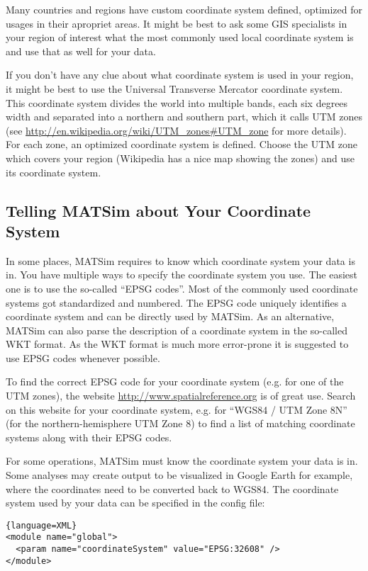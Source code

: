 Many countries and regions have custom coordinate system defined, optimized for
usages in their apropriet areas. It might be best to ask some GIS specialists in
your region of interest what the most commonly used local coordinate system is
and use that as well for your data. 

If you don't have any clue about what coordinate system is used in your region,
it might be best to use the Universal Transverse Mercator coordinate system.
This coordinate system divides the world into multiple bands, each six degrees
width and separated into a northern and southern part, which it calls UTM zones
(see \url{http://en.wikipedia.org/wiki/UTM_zones#UTM_zone} for more details).
For each zone, an optimized coordinate system is defined. Choose the UTM zone
which covers your region (Wikipedia has a nice map showing the zones) and use
its coordinate system.

\subsection{Telling MATSim about Your Coordinate System}

In some places, MATSim requires to know which coordinate system your data is in.
You have multiple ways to specify the coordinate system you use. The easiest one
is to use the so-called ``EPSG codes''. Most of the commonly used coordinate
systems got standardized and numbered. The EPSG code uniquely identifies a
coordinate system and can be directly used by MATSim. As an alternative, MATSim
can also parse the description of a coordinate system in the so-called WKT
format. As the WKT format is much more error-prone it is suggested to use EPSG
codes whenever possible.

To find the correct EPSG code for your coordinate system (e.g. for one of the
UTM zones), the website \url{http://www.spatialreference.org} is of great use.
Search on this website for your coordinate system, e.g. for ``WGS84 / UTM Zone
8N'' (for the northern-hemisphere UTM Zone 8) to find a list of matching
coordinate systems along with their EPSG codes.


For some operations, MATSim must know the coordinate system your data is in.
Some analyses may create output to be visualized in Google Earth for example,
where the coordinates need to be converted back to WGS84. The coordinate system
used by your data can be specified in the config file:

\begin{lstlisting}{language=XML}
<module name="global">
  <param name="coordinateSystem" value="EPSG:32608" />
</module>
\end{lstlisting}

